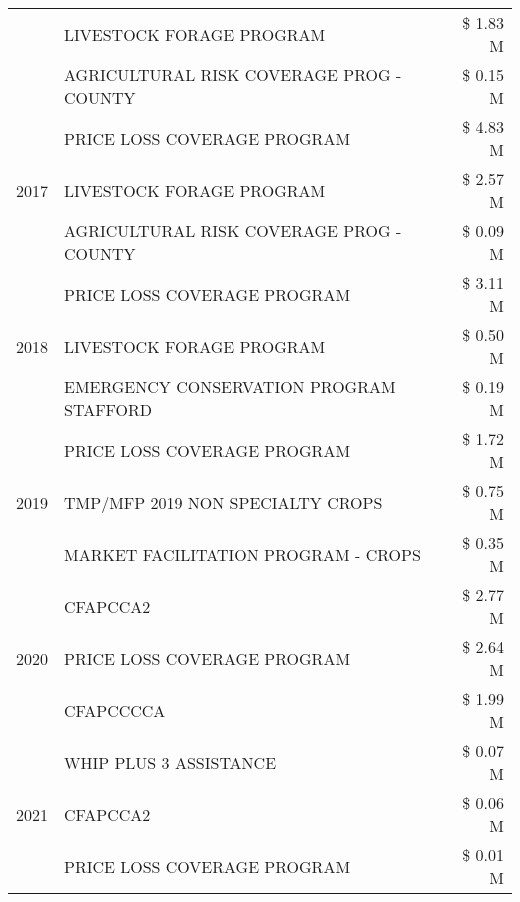 \begin{tabular}{llr}
 & LIVESTOCK FORAGE PROGRAM & \$ 1.83 M \\
 & AGRICULTURAL RISK COVERAGE PROG - COUNTY & \$ 0.15 M \\
\cline{1-3}
\multirow[t]{3}{*}{2017} & PRICE LOSS COVERAGE PROGRAM & \$ 4.83 M \\
 & LIVESTOCK FORAGE PROGRAM & \$ 2.57 M \\
 & AGRICULTURAL RISK COVERAGE PROG - COUNTY & \$ 0.09 M \\
\cline{1-3}
\multirow[t]{3}{*}{2018} & PRICE LOSS COVERAGE PROGRAM & \$ 3.11 M \\
 & LIVESTOCK FORAGE PROGRAM & \$ 0.50 M \\
 & EMERGENCY CONSERVATION PROGRAM STAFFORD & \$ 0.19 M \\
\cline{1-3}
\multirow[t]{3}{*}{2019} & PRICE LOSS COVERAGE PROGRAM & \$ 1.72 M \\
 & TMP/MFP 2019 NON SPECIALTY CROPS & \$ 0.75 M \\
 & MARKET FACILITATION PROGRAM - CROPS & \$ 0.35 M \\
\cline{1-3}
\multirow[t]{3}{*}{2020} & CFAPCCA2 & \$ 2.77 M \\
 & PRICE LOSS COVERAGE PROGRAM & \$ 2.64 M \\
 & CFAPCCCCA & \$ 1.99 M \\
\cline{1-3}
\multirow[t]{3}{*}{2021} & WHIP PLUS 3 ASSISTANCE & \$ 0.07 M \\
 & CFAPCCA2 & \$ 0.06 M \\
 & PRICE LOSS COVERAGE PROGRAM & \$ 0.01 M \\
\cline{1-3}
\bottomrule
\end{tabular}
